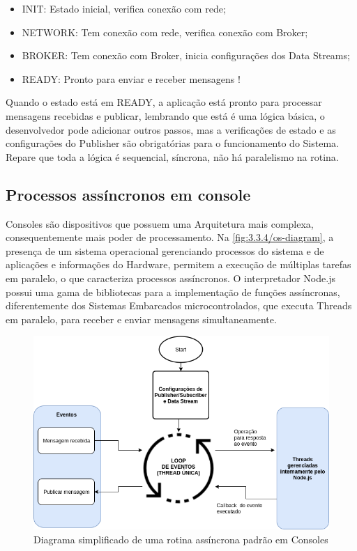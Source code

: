 \begin{itemize}
\item INIT: Estado inicial, verifica conexão com rede;
\item NETWORK: Tem conexão com rede, verifica conexão com Broker;
\item BROKER: Tem conexão com Broker, inicia configurações dos Data Streams;
\item READY: Pronto para enviar e receber mensagens !
\end{itemize}

Quando o estado está em READY, a aplicação está pronto para processar mensagens recebidas e publicar, lembrando que está é uma lógica básica, o desenvolvedor pode adicionar outros passos, mas a verificações de estado e as configurações do Publisher são obrigatórias para o funcionamento do Sistema. Repare que toda a lógica é sequencial, síncrona, não há paralelismo na rotina.

\subsection{Processos assíncronos em console}
\label{subsection:consoles_assinc}

Consoles são dispositivos que possuem uma Arquitetura mais complexa, consequentemente mais poder de processamento. Na \ref{fig:3.3.4/os-diagram}, a presença de um sistema operacional gerenciando processos do sistema e de aplicações e informações do Hardware, permitem a execução de múltiplas tarefas em paralelo, o que caracteriza processos assíncronos. O interpretador Node.js possui uma gama de bibliotecas para a implementação de funções assíncronas, diferentemente dos Sistemas Embarcados microcontrolados, que executa Threads em paralelo, para receber e enviar mensagens simultaneamente.


\begin{figure}[h!]
\centering
\includegraphics[width=13cm]{./02_Capitulos/02_Cap3/figures/async-implementation}
\caption{Diagrama simplificado de uma rotina assíncrona padrão em Consoles}
\label{fig:async-implementation}
\end{figure}

